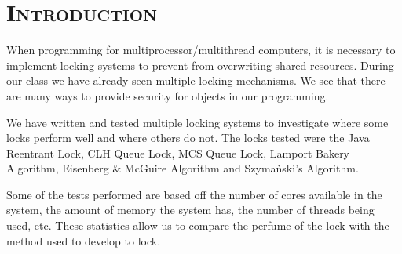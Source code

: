 \documentclass[FinalReport.tex]{subfiles}
\begin{document}
\bigskip

\section*{\textsc{\Large Introduction}}

	When programming for multiprocessor/multithread computers, it is necessary to implement locking systems to prevent from overwriting shared resources.  During our class we have already seen multiple locking mechanisms.  We see that there are many ways to provide security for objects in our programming.  
	
	We have written and tested multiple locking systems to investigate where some locks perform well and where others do not.  The locks tested were the Java Reentrant Lock, CLH Queue Lock, MCS Queue Lock, Lamport Bakery Algorithm, Eisenberg \& McGuire Algorithm and Szyma\`{n}ski's Algorithm.  
	
	Some of the tests performed are based off the number of cores available in the system, the amount of memory the system has, the number of threads being used, etc.  These statistics allow us to compare the perfume of the lock with the method used to develop to lock.
\end{document}
